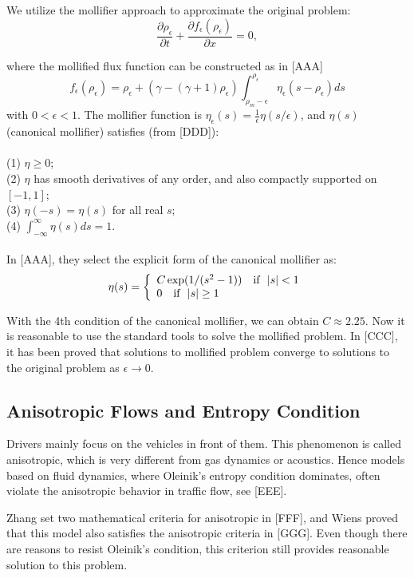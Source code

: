 \documentclass[10pt]{article}
\newcommand{\e}{\epsilon}
\newcommand{\p}{\partial}
\begin{document}
We utilize the mollifier approach to approximate the original problem:
\[
\frac{\p \rho_\e}{\p t} + \frac{\p f_\e(\rho_\e)}{\p x} = 0,
\]

where the mollified flux function can be constructed as in [AAA]
\begin{equation}
f_{\e}(\rho_{\e})=\rho_{\e}+(\gamma-(\gamma+1)\rho_{\e})\int_{\rho_m-\e}^{\rho_{\e}} \eta_\e(s-\rho_\e) ds
\label{eq:flux}
\end{equation}
with $0<\epsilon<1$. The mollifier function is $\eta_\e(s)=\frac{1}{\e}\eta(s/\e)$, and $\eta(s)$ (canonical mollifier) satisfies (from [DDD]):
\\\\
(1) $\eta\geq 0$;\\
(2) $\eta$ has smooth derivatives of any order, and also compactly supported on $[-1,1]$;\\
(3) $\eta(-s)=\eta(s)$ for all real $s$;\\
(4) $\int_{-\infty}^{\infty} \eta(s) ds=1$.
\\\\

In [AAA], they select the explicit form of the canonical mollifier as:
 \[\eta(s)=\left\{
  \begin{array}{l l}
    C\exp(1/(s^2-1)) \ \ \ \text{if}\ \ |s|<1\\
    0 \ \ \ \text{if}\ \ |s|\geq 1
  \end{array} \right.\]

  With the 4th condition of the canonical mollifier, we can obtain $C\approx 2.25$. Now it is reasonable to use the standard tools to solve the mollified problem.
  In [CCC], it has been proved that solutions to mollified problem converge to solutions to the original problem as $\e\rightarrow 0$.
\subsection{Anisotropic Flows and Entropy Condition}

Drivers mainly focus on the vehicles in front of them. This phenomenon is called anisotropic, which is very different from gas dynamics or acoustics. Hence models based on fluid dynamics, where Oleinik's entropy condition dominates, often violate the anisotropic behavior in traffic flow, see [EEE].

Zhang set two mathematical criteria for anisotropic in [FFF], and Wiens proved that this model also satisfies the anisotropic criteria in [GGG]. Even though there are reasons to resist Oleinik's condition, this criterion still provides reasonable solution to this problem.
\end{document}
